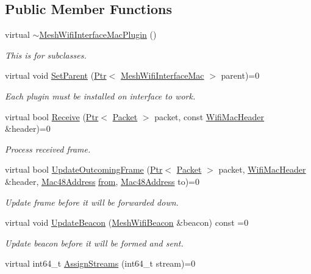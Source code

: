 \subsection*{Public Member Functions}
\begin{DoxyCompactItemize}
\item 
virtual \hyperlink{classns3_1_1MeshWifiInterfaceMacPlugin_a6f1add3c0fb56b2ebaebcf35c367db19}{$\sim$\+Mesh\+Wifi\+Interface\+Mac\+Plugin} ()
\begin{DoxyCompactList}\small\item\em This is for subclasses. \end{DoxyCompactList}\item 
virtual void \hyperlink{classns3_1_1MeshWifiInterfaceMacPlugin_a9418207bcd6efc135baca7939cdc6f39}{Set\+Parent} (\hyperlink{classns3_1_1Ptr}{Ptr}$<$ \hyperlink{classns3_1_1MeshWifiInterfaceMac}{Mesh\+Wifi\+Interface\+Mac} $>$ parent)=0
\begin{DoxyCompactList}\small\item\em Each plugin must be installed on interface to work. \end{DoxyCompactList}\item 
virtual bool \hyperlink{classns3_1_1MeshWifiInterfaceMacPlugin_a36279337239f8cbdb31162221e192236}{Receive} (\hyperlink{classns3_1_1Ptr}{Ptr}$<$ \hyperlink{classns3_1_1Packet}{Packet} $>$ packet, const \hyperlink{classns3_1_1WifiMacHeader}{Wifi\+Mac\+Header} \&header)=0
\begin{DoxyCompactList}\small\item\em Process received frame. \end{DoxyCompactList}\item 
virtual bool \hyperlink{classns3_1_1MeshWifiInterfaceMacPlugin_af14bbe6ab750951c0291b0e4144d2caf}{Update\+Outcoming\+Frame} (\hyperlink{classns3_1_1Ptr}{Ptr}$<$ \hyperlink{classns3_1_1Packet}{Packet} $>$ packet, \hyperlink{classns3_1_1WifiMacHeader}{Wifi\+Mac\+Header} \&header, \hyperlink{classns3_1_1Mac48Address}{Mac48\+Address} \hyperlink{lte__amc_8m_a1b4c81ff74eb1a626b5ade44c81004b3}{from}, \hyperlink{classns3_1_1Mac48Address}{Mac48\+Address} to)=0
\begin{DoxyCompactList}\small\item\em Update frame before it will be forwarded down. \end{DoxyCompactList}\item 
virtual void \hyperlink{classns3_1_1MeshWifiInterfaceMacPlugin_a918469724b1e324a30deaa9703cff3d1}{Update\+Beacon} (\hyperlink{classns3_1_1MeshWifiBeacon}{Mesh\+Wifi\+Beacon} \&beacon) const =0
\begin{DoxyCompactList}\small\item\em Update beacon before it will be formed and sent. \end{DoxyCompactList}\item 
virtual int64\+\_\+t \hyperlink{classns3_1_1MeshWifiInterfaceMacPlugin_a04c64b14381481b5caa0c7e65c7af0e3}{Assign\+Streams} (int64\+\_\+t stream)=0
\end{DoxyCompactItemize}
